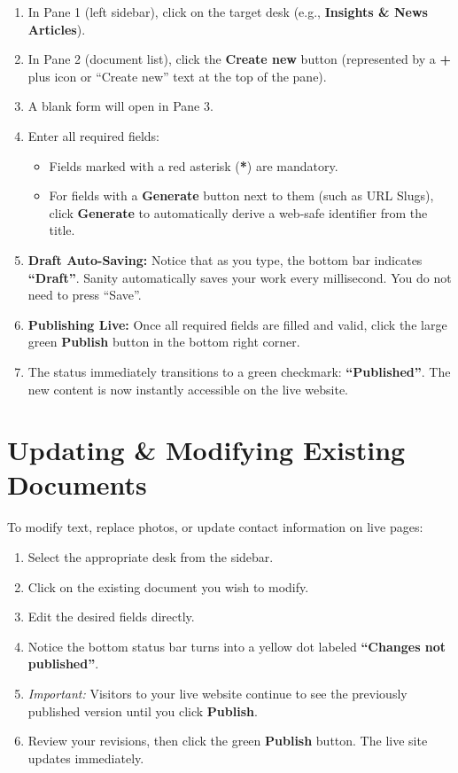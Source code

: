 \documentclass[11pt,a4paper,oneside]{book}
\begin{document}
\begin{enumerate}[leftmargin=*,label=\textbf{Step \arabic*:}]
  \item In Pane 1 (left sidebar), click on the target desk (e.g., \textbf{Insights \& News Articles}).
  \item In Pane 2 (document list), click the \textbf{Create new} button (represented by a \textbf{+} plus icon or ``Create new'' text at the top of the pane).
  \item A blank form will open in Pane 3.
  \item Enter all required fields:
    \begin{itemize}[leftmargin=1.2cm]
      \item Fields marked with a red asterisk (\textcolor{HGGRed}{\textbf{*}}) are mandatory.
      \item For fields with a \textbf{Generate} button next to them (such as URL Slugs), click \textbf{Generate} to automatically derive a web-safe identifier from the title.
    \end{itemize}
  \item \textbf{Draft Auto-Saving:} Notice that as you type, the bottom bar indicates \textbf{``Draft''}. Sanity automatically saves your work every millisecond. You do not need to press ``Save''.
  \item \textbf{Publishing Live:} Once all required fields are filled and valid, click the large green \textbf{Publish} button in the bottom right corner.
  \item The status immediately transitions to a green checkmark: \textbf{``Published''}. The new content is now instantly accessible on the live website.
\end{enumerate}

\section{Updating \& Modifying Existing Documents}
To modify text, replace photos, or update contact information on live pages:

\begin{enumerate}[leftmargin=*,label=\textbf{Step \arabic*:}]
  \item Select the appropriate desk from the sidebar.
  \item Click on the existing document you wish to modify.
  \item Edit the desired fields directly.
  \item Notice the bottom status bar turns into a yellow dot labeled \textbf{``Changes not published''}.
  \item \textit{Important:} Visitors to your live website continue to see the previously published version until you click \textbf{Publish}.
  \item Review your revisions, then click the green \textbf{Publish} button. The live site updates immediately.
\end{enumerate}
\end{document}
